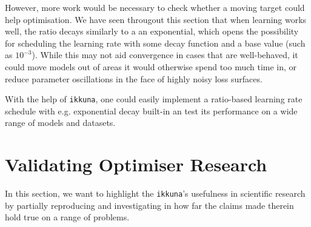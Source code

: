 However, more work would be necessary to check whether a moving target could
help optimisation. We have seen througout this section that  when learning works
well, the ratio decays similarly to a an exponential, which opens the
possibility for scheduling the learning rate with some decay function and a base
value (such as $10^{-3}$).  While this may not aid convergence in cases that are
well-behaved, it could move models out of areas it would otherwise spend too
much time in, or reduce parameter oscillations in the face of highly noisy loss
surfaces.

With the help of \texttt{ikkuna}, one could easily implement a ratio-based
learning rate schedule with e.g. exponential decay built-in an test its
performance on a wide range of models and datasets.

\section{Validating Optimiser Research}%
\label{sec:adam}

In this section, we want to highlight the \texttt{ikkuna}'s usefulness in
scientific research by partially reproducing \citep{kingma2014adam} and
investigating in how far the claims made therein hold true on a range of
problems.
